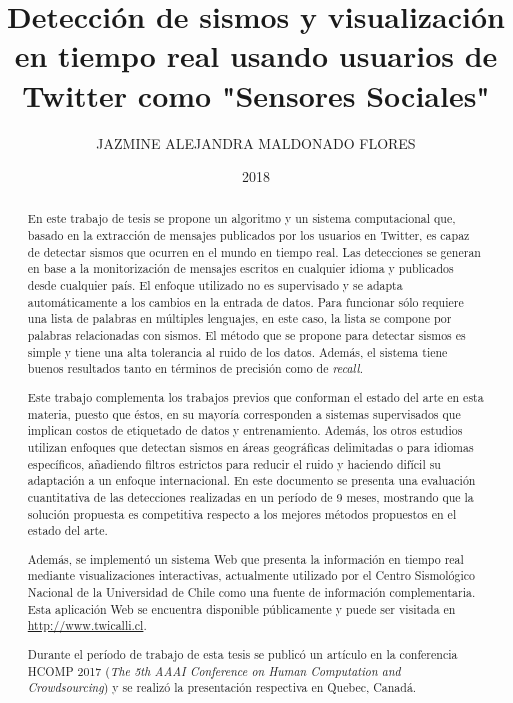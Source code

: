 \documentclass[upright, contnum]{umemoria}
\author{JAZMINE ALEJANDRA MALDONADO FLORES}
\title{Detección de sismos y visualización en tiempo real usando usuarios de Twitter como "Sensores Sociales"}
\date{2018}
\begin{document}
\frontmatter
\maketitle

\begin{abstract}

En este trabajo de tesis se propone un algoritmo y un sistema computacional que, basado en la extracción de mensajes publicados por los usuarios en Twitter, es capaz de detectar sismos que ocurren en el mundo en tiempo real. Las detecciones se generan en base a la monitorización de mensajes escritos en cualquier idioma y publicados desde cualquier país. El enfoque utilizado no es supervisado y se adapta automáticamente a los cambios en la entrada de datos. Para funcionar sólo requiere una lista de palabras en múltiples lenguajes, en este caso, la lista se compone por palabras relacionadas con sismos. 
El método que se propone para detectar sismos es simple y tiene una alta tolerancia al ruido de los datos.  Además, el sistema tiene buenos resultados tanto en términos de precisión como de \textit{recall}. 

Este trabajo complementa los trabajos previos que conforman el estado del arte en esta materia, puesto que éstos, en su mayoría corresponden a sistemas supervisados que implican costos de etiquetado de datos y entrenamiento. Además, los otros estudios utilizan enfoques que detectan sismos en áreas geográficas delimitadas o para idiomas específicos, añadiendo filtros estrictos para reducir el ruido y haciendo difícil su adaptación a un enfoque internacional. En este documento se presenta una evaluación cuantitativa de las detecciones realizadas en un período de 9 meses, mostrando que la solución propuesta es competitiva respecto a los mejores métodos propuestos en el estado del arte. 

Además, se implementó un sistema Web que presenta la información en tiempo real mediante visualizaciones interactivas, actualmente utilizado por el Centro Sismológico Nacional de la Universidad de Chile como una fuente de información complementaria. Esta aplicación Web se encuentra disponible públicamente y puede ser visitada en \url{http://www.twicalli.cl}.

Durante el período de trabajo de esta tesis se publicó un artículo en la conferencia HCOMP 2017 (\textit{The 5th AAAI Conference on Human Computation and Crowdsourcing}) y se realizó la presentación respectiva en Quebec, Canadá.  

\end{abstract}
\end{document}
